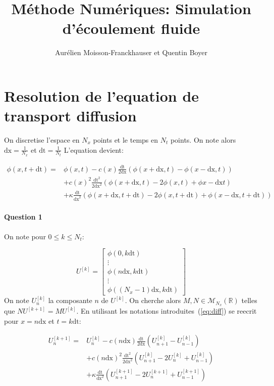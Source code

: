 \documentclass{article}
\newcommand{\dx}{\mathrm{dx}}
\newcommand{\dt}{\mathrm{dt}}
\begin{document}
\title{Méthode Numériques: Simulation d'écoulement fluide}
\author{Aurélien Moisson-Franckhauser et Quentin Boyer}
\maketitle

\section{Resolution de l'equation de transport diffusion}

On discretise l'espace en $N_x$ points et le temps en $N_t$ points. On note alors $\mathrm{dx}=\frac{1}{N_x}$ et $\mathrm{dt}=\frac{1}{N_t}$
L'equation devient:


\begin{equation}
	\begin{aligned}
	\phi(x,t+\dt) ={} & \phi(x,t)-c(x)\frac{\dt}{2\dx}(\phi(x+\dx, t)-\phi(x-\dx,t)) \\
					&+c{(x)}^2\frac{\dt^{2}}{2\dx^{2}}(\phi(x+\dx,t)-2\phi(x, t)+\phi{x-\dx}{t}) \\
					&+\kappa\frac{\dt}{\dx^2}(\phi(x+\dx,t+\dt)-2\phi(x,t+\dt)+\phi(x-\dx,t+\dt))
	\end{aligned}
	\label{eq:diff}
\end{equation}


\paragraph{Question 1}
On note pour $0 \leq k \le N_t$:

\[U^{[k]}=
\begin{bmatrix}
	\phi(0, k\dt) \\
	\vdots \\
	\phi(n\dx, k\dt) \\
	\vdots \\
	\phi((N_x-1)\dx, k\dt)
\end{bmatrix}
\]
On note $U_n^{[k]}$ la composante $n$ de $U^{[k]}$. On cherche alors $ M,N \in \mathcal{M}_{N_x}(\mathbb{R})$ telles que $NU^{[k+1]}=MU^{[k]}$.
En utilisant les notations introduites~(\ref{eq:diff}) se reecrit pour $x=n\dx$ et $t=k\dt$:

\[
	\begin{aligned}
		U^{[k+1]}_n ={} & U_n^{[k]} - c(n\dx)\frac{\dt}{2\dx}(U_{n+1}^{[k]}-U_{n-1}^{[k]}) \\
		& +c{(n\dx)}^2\frac{\dt^{2}}{2\dx^{2}}(U_{n+1}^{[k]}-2U_{n}^{[k]}+U_{n-1}^{[k]}) \\
						& +\kappa\frac{\dt}{\dx^2}(U_{n+1}^{[k+1]}-2U_{n}^{[k+1]}+U_{n-1}^{[k+1]})
	\end{aligned}
\]
\end{document}
